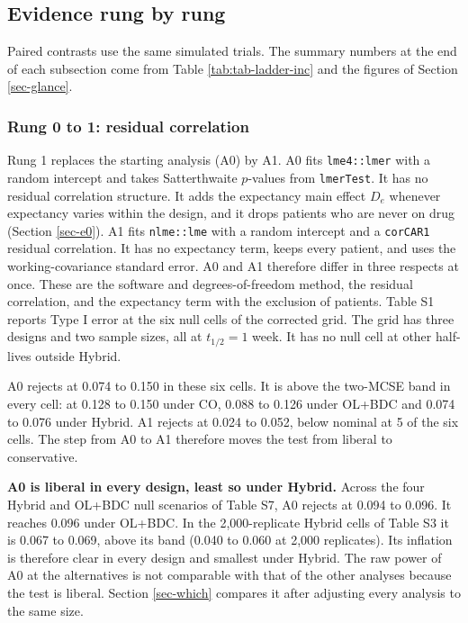 \documentclass[
  11pt,
]{article}
\begin{document}
\subsection{Evidence rung by rung}\label{sec-rungs}

Paired contrasts use the same simulated trials. The summary numbers at
the end of each subsection come from Table \ref{tab:tab-ladder-inc}
and the figures of Section \ref{sec-glance}.

\subsubsection{Rung 0 to 1: residual correlation}\label{sec-rung1}

Rung 1 replaces the starting analysis (A0) by A1. A0 fits \texttt{lme4::lmer}
with a random intercept and takes Satterthwaite \(p\)-values from
\texttt{lmerTest}. It has no residual correlation structure. It adds the
expectancy main effect \(D_e\) whenever expectancy varies within the
design, and it drops patients who are never on drug (Section
\ref{sec-e0}). A1 fits
\texttt{nlme::lme} with a random intercept and a \texttt{corCAR1} residual
correlation. It has no expectancy term, keeps every patient, and uses
the working-covariance standard error. A0 and A1 therefore differ in three
respects at once. These are the software and degrees-of-freedom method,
the residual correlation, and the expectancy term with the exclusion of
patients. Table S1 reports Type I error at the six
null cells of the corrected grid. The grid has three designs and two
sample sizes, all at \(t_{1/2} = 1\) week. It has no null cell at other
half-lives outside Hybrid.

A0 rejects at 0.074 to 0.150 in these six
cells. It is above the two-MCSE band in every cell: at
0.128 to 0.150 under CO, 0.088 to 0.126 under OL+BDC
and 0.074 to 0.076 under Hybrid. A1 rejects at
0.024 to 0.052, below nominal at
5 of the six cells. The step from A0 to
A1 therefore moves the test from liberal to conservative.

\textbf{A0 is liberal in every design, least so under Hybrid.} Across the four Hybrid and OL+BDC null scenarios of
Table S7, A0 rejects at
0.094 to 0.096.
It reaches 0.096 under OL+BDC. In
the 2,000-replicate Hybrid cells of Table S3 it
is 0.067 to 0.069, above its band
(0.040 to 0.060 at 2,000 replicates). Its inflation is therefore
clear in every design and smallest under Hybrid. The raw power of A0
at the alternatives is not comparable with that of the other analyses
because the test is liberal. Section \ref{sec-which} compares it
after adjusting every analysis to the same size.
\end{document}
